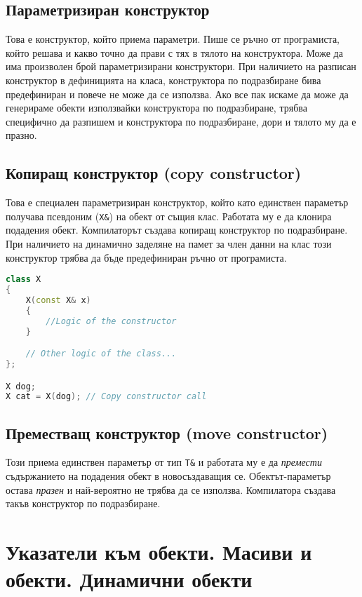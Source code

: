 \documentclass[fleqn,12pt]{article}
\begin{document}
\subsection{Параметризиран конструктор}
Това е конструктор, който приема параметри. Пише се ръчно от програмиста, който решава и какво точно да прави с тях
в тялото на конструктора. Може да има произволен брой параметризирани конструктори. При наличието на разписан конструктор в дефиницията на класа, конструктора по подразбиране бива предефиниран и повече не може да се използва. Ако все пак искаме да може да генерираме обекти използвайки конструктора по подразбиране, трябва специфично да разпишем и конструктора по подразбиране, дори и тялото му да е празно.

\subsection{Копиращ конструктор (copy constructor)}
Това е специален параметризиран конструктор, който като единствен параметър получава псевдоним (\texttt{X\&}) на обект от същия клас.
Работата му е да клонира подадения обект. Компилаторът създава копиращ конструктор по подразбиране. При наличието на динамично заделяне на памет за член данни на клас този конструктор трябва да бъде предефиниран ръчно от програмиста.

\begin{lstlisting}[language=C++, caption=Copy constructor]
class X
{
    X(const X& x)
    {
        //Logic of the constructor
    }

    // Other logic of the class...
};

X dog;
X cat = X(dog); // Copy constructor call
\end{lstlisting}


\subsection{Преместващ конструктор (move constructor)}

Този приема единствен параметър от тип \texttt{T\&} и работата му е да \textit{премести} съдържанието на подадения обект 
в новосъздаващия се. Обектът-параметър остава \textit{празен} и най-вероятно не трябва да се използва.
Компилатора създава такъв конструктор по подразбиране.

\section{Указатели към обекти. Масиви и обекти. Динамични обекти}
\end{document}
